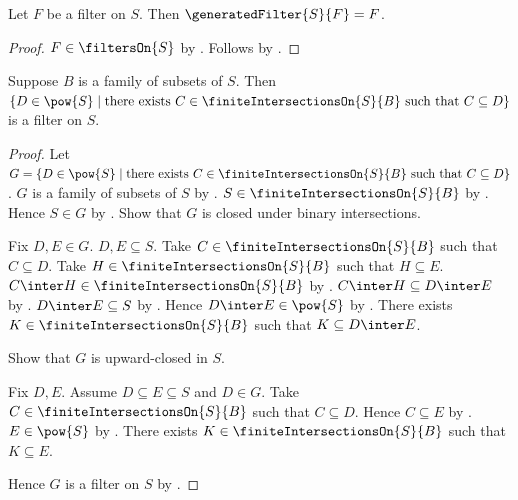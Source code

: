\begin{theorem}\label{filter_generates_itself}
    Let $F$ be a filter on $S$.
    Then $\generatedFilter{S}{F}=F$.
\end{theorem}
\begin{proof}
    $F\in\filtersOn{S}$ by .
    Follows by
        .
\end{proof}

\begin{proposition}\label{finite_intersection_supersets_are_filter}
    Suppose $B$ is a family of subsets of $S$.
    Then
        $\{D\in\pow{S}\mid
            \text{there exists $C\in\finiteIntersectionsOn{S}{B}$ such that
                $C\subseteq D$}\}$
        is a filter on $S$.
\end{proposition}
\begin{proof}
    Let $G=\{D\in\pow{S}\mid
        \text{there exists $C\in\finiteIntersectionsOn{S}{B}$ such that
            $C\subseteq D$}\}$.
    $G$ is a family of subsets of $S$ by
        .
    $S\in\finiteIntersectionsOn{S}{B}$ by
        .
    Hence $S\in G$ by .
    Show that $G$ is closed under binary intersections.
    \begin{subproof}
        Fix $D,E\in G$.
        $D,E\subseteq S$.
        Take $C\in\finiteIntersectionsOn{S}{B}$ such that $C\subseteq D$.
        Take $H\in\finiteIntersectionsOn{S}{B}$ such that $H\subseteq E$.
        $C\inter H\in\finiteIntersectionsOn{S}{B}$ by
            .
        $C\inter H\subseteq D\inter E$ by .
        $D\inter E\subseteq S$ by .
        Hence $D\inter E\in\pow{S}$ by .
        There exists $K\in\finiteIntersectionsOn{S}{B}$ such that
            $K\subseteq D\inter E$.
    \end{subproof}
    Show that $G$ is upward-closed in $S$.
    \begin{subproof}
        Fix $D,E$.
        Assume $D\subseteq E\subseteq S$ and $D\in G$.
        Take $C\in\finiteIntersectionsOn{S}{B}$ such that $C\subseteq D$.
        Hence $C\subseteq E$ by .
        $E\in\pow{S}$ by .
        There exists $K\in\finiteIntersectionsOn{S}{B}$ such that
            $K\subseteq E$.
    \end{subproof}
    Hence $G$ is a filter on $S$ by .
\end{proof}

